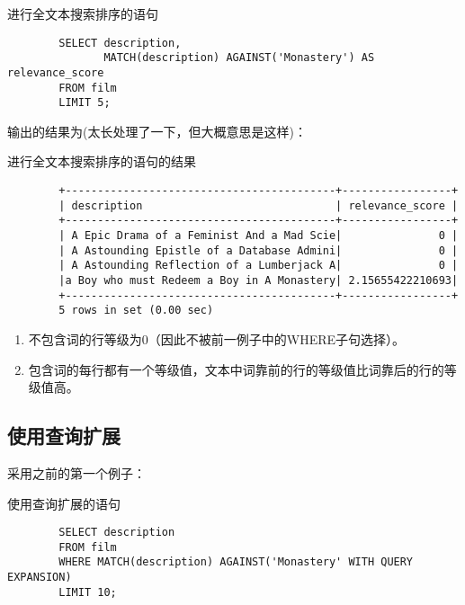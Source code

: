 \documentclass[UTF8]{article}
\begin{document}
\begin{listing}[H]
        \caption{进行全文本搜索排序的语句}
	\label{code:fulltextselectorderclause}
\begin{verbatim}
        SELECT description,
               MATCH(description) AGAINST('Monastery') AS relevance_score
        FROM film
        LIMIT 5;
\end{verbatim}
\end{listing}

输出的结果为(太长处理了一下，但大概意思是这样)：

\begin{listing}[H]
	\caption{进行全文本搜索排序的语句的结果}
	\label{code:fulltextselectorderclauseresult}
\begin{verbatim}
        +------------------------------------------+-----------------+
        | description                              | relevance_score |
        +------------------------------------------+-----------------+
        | A Epic Drama of a Feminist And a Mad Scie|               0 |
        | A Astounding Epistle of a Database Admini|               0 |
        | A Astounding Reflection of a Lumberjack A|               0 |
        |a Boy who must Redeem a Boy in A Monastery| 2.15655422210693|
        +------------------------------------------+-----------------+
        5 rows in set (0.00 sec)
\end{verbatim}
\end{listing}

\begin{orangebox}[frametitle={Tips 18.2.2 计算出来的等级值}]
        \begin{enumerate}
                \item 不包含词的行等级为0（因此不被前一例子中的WHERE子句选择）。
                \item 包含词的每行都有一个等级值，文本中词靠前的行的等级值比词靠后的行的等级值高。
        \end{enumerate}
\end{orangebox}  

\subsection{使用查询扩展}

采用之前的第一个例子：
\begin{listing}[H]
        \caption{使用查询扩展的语句}
	\label{code:usesearchexpansionclause}
\begin{verbatim}
        SELECT description 
        FROM film 
        WHERE MATCH(description) AGAINST('Monastery' WITH QUERY EXPANSION)
        LIMIT 10; 
\end{verbatim}
\end{listing}
\end{document}

